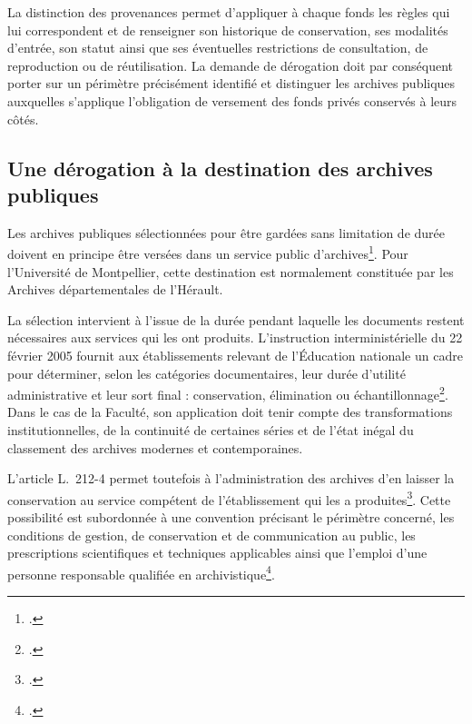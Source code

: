 La distinction des provenances permet d'appliquer à chaque fonds les règles qui lui correspondent et de renseigner son historique de conservation, ses modalités d'entrée, son statut ainsi que ses éventuelles restrictions de consultation, de reproduction ou de réutilisation. La demande de dérogation doit par conséquent porter sur un périmètre précisément identifié et distinguer les archives publiques auxquelles s'applique l'obligation de versement des fonds privés conservés à leurs côtés.

\subsection{Une dérogation à la destination des archives publiques}

Les archives publiques sélectionnées pour être gardées sans limitation de durée doivent en principe être versées dans un service public d'archives\footcite[art.~L.~212-4, I]{CodePatrimoine}. Pour l'Université de Montpellier, cette destination est normalement constituée par les Archives départementales de l'Hérault.

La sélection intervient à l'issue de la durée pendant laquelle les documents restent nécessaires aux services qui les ont produits. L'instruction interministérielle du 22 février 2005 fournit aux établissements relevant de l'Éducation nationale un cadre pour déterminer, selon les catégories documentaires, leur durée d'utilité administrative et leur sort final : conservation, élimination ou échantillonnage\footcite{InstructionArchivesEducation2005}. Dans le cas de la Faculté, son application doit tenir compte des transformations institutionnelles, de la continuité de certaines séries et de l'état inégal du classement des archives modernes et contemporaines.

L'article L.~212-4 permet toutefois à l'administration des archives d'en laisser la conservation au service compétent de l'établissement qui les a produites\footcite[art.~L.~212-4, I]{CodePatrimoine}. Cette possibilité est subordonnée à une convention précisant le périmètre concerné, les conditions de gestion, de conservation et de communication au public, les prescriptions scientifiques et techniques applicables ainsi que l'emploi d'une personne responsable qualifiée en archivistique\footcite[art.~R.~212-12]{CodePatrimoine}.

